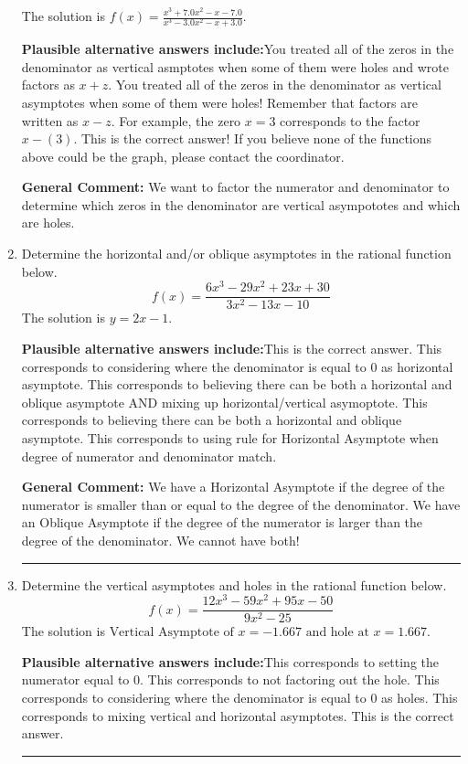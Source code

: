 \documentclass{extbook}[14pt]
\newcommand{\litem}[1]{\item #1

\rule{\textwidth}{0.4pt}}
\begin{document}
\begin{enumerate}
{The solution is \( f(x)=\frac{x^{3} +7.0 x^{2} -x -7.0}{x^{3} -3.0 x^{2} -x + 3.0} \).\begin{enumerate}[label=\Alph*.]
\textbf{Plausible alternative answers include:}You treated all of the zeros in the denominator as vertical asmptotes when some of them were holes and wrote factors as $x+z$.
You treated all of the zeros in the denominator as vertical asymptotes when some of them were holes!
Remember that factors are written as $x-z$. For example, the zero $x=3$ corresponds to the factor $x-(3)$.
This is the correct answer!
If you believe none of the functions above could be the graph, please contact the coordinator.
\end{enumerate}

\textbf{General Comment:} We want to factor the numerator and denominator to determine which zeros in the denominator are vertical asympototes and which are holes.
}
\litem{
Determine the horizontal and/or oblique asymptotes in the rational function below.
\[ f(x) = \frac{6x^{3} -29 x^{2} +23 x + 30}{3x^{2} -13 x -10} \]The solution is \( y = 2x -1 \).\begin{enumerate}[label=\Alph*.]
\textbf{Plausible alternative answers include:}This is the correct answer.
This corresponds to considering where the denominator is equal to 0 as horizontal asymptote.
This corresponds to believing there can be both a horizontal and oblique asymptote AND mixing up horizontal/vertical asymoptote.
This corresponds to believing there can be both a horizontal and oblique asymptote.
This corresponds to using rule for Horizontal Asymptote when degree of numerator and denominator match.
\end{enumerate}

\textbf{General Comment:} We have a Horizontal Asymptote if the degree of the numerator is smaller than or equal to the degree of the denominator. We have an Oblique Asymptote if the degree of the numerator is larger than the degree of the denominator. We cannot have both!
}
\litem{
Determine the vertical asymptotes and holes in the rational function below.
\[ f(x) = \frac{12x^{3} -59 x^{2} +95 x -50}{9x^{2} -25} \]The solution is \( \text{Vertical Asymptote of } x = -1.667 \text{ and hole at } x = 1.667 \).\begin{enumerate}[label=\Alph*.]
\textbf{Plausible alternative answers include:}This corresponds to setting the numerator equal to 0.
This corresponds to not factoring out the hole.
This corresponds to considering where the denominator is equal to 0 as holes.
This corresponds to mixing vertical and horizontal asymptotes.
This is the correct answer.
\end{enumerate}

}
\end{enumerate}
\end{document}
